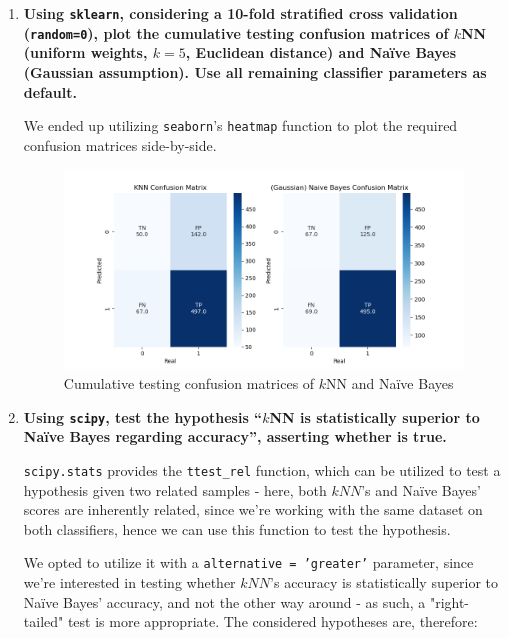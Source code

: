 \documentclass[12pt]{article}
\begin{document}
\begin{enumerate}[leftmargin=\labelsep,resume]
  \item \textbf{Using \texttt{sklearn}, considering a 10-fold stratified cross validation (\texttt{random=0}), plot the cumulative
  testing confusion matrices of $k$NN (uniform weights, $k = 5$, Euclidean distance) and Naïve Bayes
  (Gaussian assumption). Use all remaining classifier parameters as default.}

  We ended up utilizing \texttt{seaborn}'s \texttt{heatmap} function to plot the
  required confusion matrices side-by-side.

  \begin{figure}[h]
    \centering
    \includegraphics[width=1.1\textwidth]{../assets/hw2-2.1.png}
    \caption{Cumulative testing confusion matrices of $k$NN and Naïve Bayes}
    \label{fig:fig1}
  \end{figure}

  \pagebreak

  \item \textbf{Using \texttt{scipy}, test the hypothesis “$k$NN is statistically superior to Naïve Bayes regarding
  accuracy”, asserting whether is true.}

  \texttt{scipy.stats} provides the \texttt{ttest\_rel} function, which can be utilized
  to test a hypothesis given two related samples - here, both $kNN$'s and Naïve Bayes'
  scores are inherently related, since we're working with the same dataset on both
  classifiers, hence we can use this function to test the hypothesis.
  
  We opted to utilize it with a \texttt{alternative = 'greater'} parameter, since
  we're interested in testing whether $kNN$'s accuracy is statistically superior
  to Naïve Bayes' accuracy, and not the other way around - as such, a "right-tailed"
  test is more appropriate.
  The considered hypotheses are, therefore:


\end{enumerate}
\end{document}

